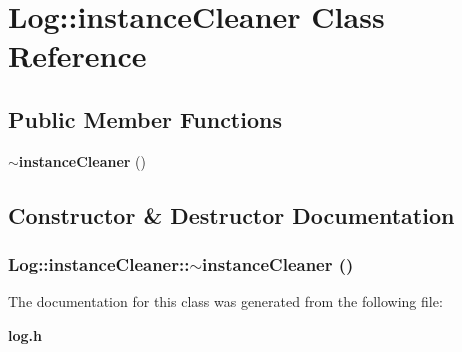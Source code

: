 \section{Log::instance\-Cleaner Class Reference}
\label{classLog_1_1instanceCleaner}
\subsection*{Public Member Functions}
\begin{CompactItemize}
\item 
{\bf $\sim$instance\-Cleaner} ()
\end{CompactItemize}


\subsection{Constructor \& Destructor Documentation}
\subsubsection{\setlength{\rightskip}{0pt plus 5cm}Log::instance\-Cleaner::$\sim$instance\-Cleaner ()\hspace{0.3cm}{\tt  [inline]}}\label{classLog_1_1instanceCleaner_5e2dd96e4f58345bd2067cd40fbec865}




The documentation for this class was generated from the following file:\begin{CompactItemize}
\item 
{\bf log.h}\end{CompactItemize}
